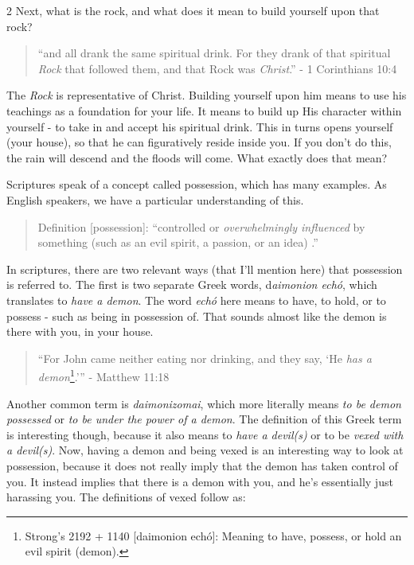 \documentclass[10pt]{article}
\begin{document}
\begin{multicols}{2}
Next, what is the rock, and what does it mean to build yourself upon that rock? 
\begin{quotation}
``and all drank the same spiritual drink. For they drank of that spiritual \textit{Rock} that followed them, and that Rock was \textit{Christ}.'' - 1 Corinthians 10:4
\end{quotation}
The \textit{Rock} is representative of Christ. Building yourself upon him means to use his teachings as a foundation for your life. It means to build up His character within yourself - to take in and accept his spiritual drink. This in turns opens yourself (your house), so that he can figuratively reside inside you. If you don't do this, the rain will descend and the floods will come. What exactly does that mean?

Scriptures speak of a concept called possession, which has many examples. As English speakers, we have a particular understanding of this.
\begin{quotation}
Definition [possession]: ``controlled or \textit{overwhelmingly influenced} by something (such as an evil spirit, a passion, or an idea) \cite{possession_defn}.''
\end{quotation}
In scriptures, there are two relevant ways (that I'll mention here) that possession is referred to. The first is two separate Greek words, d\textit{aimonion echó}, which translates to \textit{have a demon}. The word \textit{echó} here means to have, to hold, or to possess - such as being in possession of. That sounds almost like the demon is there with you, in your house.
\begin{quotation}
``For John came neither eating nor drinking, and they say, `He \textit{has a demon}\footnote{Strong's 2192 + 1140 [daimonion echó]: Meaning to have, possess, or hold an evil spirit (demon).}.'\thinspace'' - Matthew 11:18
\end{quotation}
Another common term is \textit{daimonizomai}, which more literally means \textit{to be demon possessed} or \textit{to be under the power of a demon}. The definition of this Greek term is interesting though, because it also means to \textit{have a devil(s)} or to be \textit{vexed with a devil(s)}. Now, having a demon and being vexed is an interesting way to look at possession, because it does not really imply that the demon has taken control of you. It instead implies that there is a demon with you, and he's essentially just harassing you. The definitions of vexed \cite{vexed_defn} follow as:
\begin{itemize}

\end{itemize}
\end{multicols}
\end{document}
